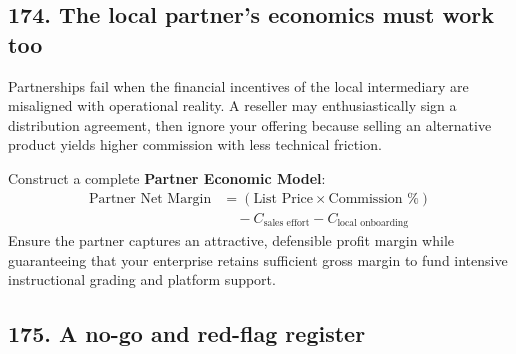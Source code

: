 \subsection{174. The local partner's economics must work too}

Partnerships fail when the financial incentives of the local intermediary are misaligned with operational reality. A reseller may enthusiastically sign a distribution agreement, then ignore your offering because selling an alternative product yields higher commission with less technical friction.

Construct a complete \textbf{Partner Economic Model}:
\begin{equation}
\begin{aligned}
\text{Partner Net Margin} &= (\text{List Price} \times \text{Commission \%}) \\
&\quad - C_{\text{sales effort}} - C_{\text{local onboarding}}
\end{aligned}
\end{equation}
Ensure the partner captures an attractive, defensible profit margin while guaranteeing that your enterprise retains sufficient gross margin to fund intensive instructional grading and platform support.

\subsection{175. A no-go and red-flag register}

